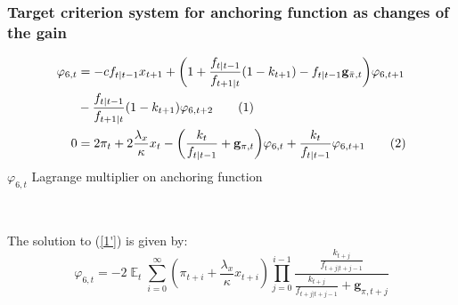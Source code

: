 \documentclass[10pt]{beamer}
\newcommand\numberthis{\addtocounter{equation}{1}\tag{\theequation}} %
\DeclareMathOperator{\E}{\mathbb{E}}
\begin{document}
\begin{frame}[plain]  %
	\frametitle{Target criterion system for anchoring function as changes of the gain}
	\label{generalTC}

\begin{align*}
\varphi_{6,t} & = -c f_{t|t-1} x_{t+1} + \bigg(1+ \frac{f_{t|t-1}}{f_{t+1|t}}(1-k_{t+1}) -f_{t|t-1} \mathbf{g}_{\bar{\pi},t} \bigg) \varphi_{6,t+1} \\
& -\frac{f_{t|t-1}}{f_{t+1|t}}(1-k_{t+1})\varphi_{6,t+2} \numberthis \label{6'} \\
0 & = 2\pi_t + 2\frac{\lambda_x}{\kappa}x_t   - \bigg( \frac{k_t}{f_{t|t-1}} + \mathbf{g}_{\pi,t}\bigg)\varphi_{6,t} + \frac{k_t}{f_{t|t-1}}\varphi_{6,t+1}\numberthis \label{1'}
\end{align*}
$\varphi_{6,t}$ Lagrange multiplier on anchoring function

\

The solution to (\ref{1'}) is given by:
\begin{equation}
\varphi_{6,t} = -2\E_t\sum_{i=0}^{\infty}(\pi_{t+i}+\frac{\lambda_x}{\kappa}x_{t+i})\prod_{j=0}^{i-1}\frac{\frac{k_{t+j}}{f_{t+j|t+j-1}}}{\frac{k_{t+j}}{f_{t+j|t+j-1}} + \mathbf{g}_{\pi, t+j}} \label{sol1'}
\end{equation}


\vspace{-0.5cm}
 
\hyperlink{anchTC}{}	


\end{frame}
\end{document}
